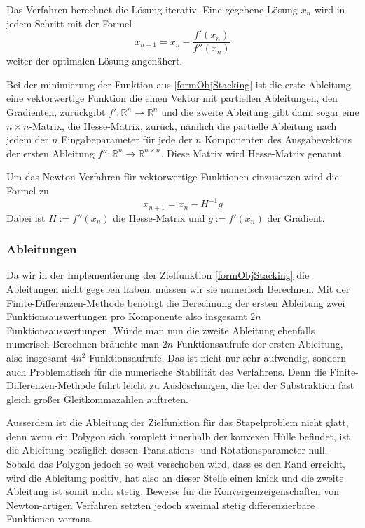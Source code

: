 \documentclass[runningheads,a4paper]{llncs}
\begin{document}
Das Verfahren berechnet die Lösung iterativ. Eine gegebene Lösung $x_n$ wird in jedem Schritt mit der Formel
\begin{equation*}
x_{n+1} = x_n - \frac{f'(x_n)}{f''(x_n)}
\end{equation*}
weiter der optimalen Lösung angenähert.

Bei der minimierung der Funktion aus \ref{formObjStacking} ist die erste Ableitung eine vektorwertige Funktion die einen Vektor mit partiellen Ableitungen, den Gradienten, zurückgibt $f': \mathbb{R}^n \rightarrow \mathbb{R}^n$ und die zweite Ableitung gibt dann sogar eine $n\times n$-Matrix, die Hesse-Matrix, zurück, nämlich die partielle Ableitung nach jedem der $n$ Eingabeparameter für jede der $n$ Komponenten des Ausgabevektors der ersten Ableitung $f'': \mathbb{R}^n \rightarrow \mathbb{R}^{n\times n}$. Diese Matrix wird Hesse-Matrix genannt.

Um das Newton Verfahren für vektorwertige Funktionen einzusetzen wird die Formel zu
\begin{equation*}
x_{n+1} = x_n - H^{-1}g
\end{equation*}
Dabei ist $H := f''(x_n)$ die Hesse-Matrix und $g := f'(x_n)$ der Gradient.

\subsubsection{Ableitungen}

Da wir in der Implementierung der Zielfunktion \ref{formObjStacking} die Ableitungen nicht gegeben haben, müssen wir sie numerisch Berechnen. Mit der Finite-Differenzen-Methode benötigt die Berechnung der ersten Ableitung zwei Funktionsauswertungen pro Komponente also insgesamt $2n$ Funktionsauswertungen. Würde man nun die zweite Ableitung ebenfalls numerisch Berechnen bräuchte man $2n$ Funktionsaufrufe der ersten Ableitung, also insgesamt $4n^2$ Funktionsaufrufe. Das ist nicht nur sehr aufwendig, sondern auch Problematisch für die numerische Stabilität des Verfahrens. Denn die Finite-Differenzen-Methode führt leicht zu Auslöschungen, die bei der Substraktion fast gleich großer Gleitkommazahlen auftreten.

Ausserdem ist die Ableitung der Zielfunktion für das Stapelproblem nicht glatt, denn wenn ein Polygon sich komplett innerhalb der konvexen Hülle befindet, ist die Ableitung bezüglich dessen Translations- und Rotationsparameter null. Sobald das Polygon jedoch so weit verschoben wird, dass es den Rand erreicht, wird die Ableitung positiv, hat also an dieser Stelle einen knick und die zweite Ableitung ist somit nicht stetig. Beweise für die Konvergenzeigenschaften von Newton-artigen Verfahren setzten jedoch zweimal stetig differenzierbare Funktionen vorraus.
\end{document}
